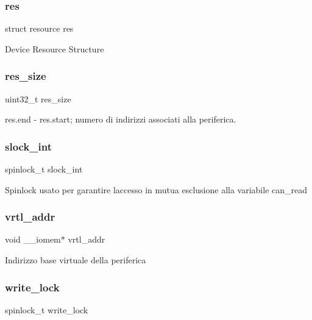 \subsubsection{\texorpdfstring{res}{res}}
{\footnotesize\ttfamily struct resource res}

Device Resource Structure \mbox{\label{structUART_aecb03114c495140683cbdd552214bc75}} 
\subsubsection{\texorpdfstring{res\+\_\+size}{res\_size}}
{\footnotesize\ttfamily uint32\+\_\+t res\+\_\+size}

res.\+end -\/ res.\+start; numero di indirizzi associati alla periferica. \mbox{\label{structUART_a1e1ddf972b4dc84dd331a0c72e5d9895}} 
\subsubsection{\texorpdfstring{slock\+\_\+int}{slock\_int}}
{\footnotesize\ttfamily spinlock\+\_\+t slock\+\_\+int}

Spinlock usato per garantire l\textquotesingle{}accesso in mutua esclusione alla variabile can\+\_\+read \mbox{\label{structUART_a9b5bc69d3a72a01759531f90e71c8850}} 
\subsubsection{\texorpdfstring{vrtl\+\_\+addr}{vrtl\_addr}}
{\footnotesize\ttfamily void \+\_\+\+\_\+iomem$\ast$ vrtl\+\_\+addr}

Indirizzo base virtuale della periferica \mbox{\label{structUART_a94adacec45d37c54ea4e16ac6d063c9f}} 
\subsubsection{\texorpdfstring{write\+\_\+lock}{write\_lock}}
{\footnotesize\ttfamily spinlock\+\_\+t write\+\_\+lock}

